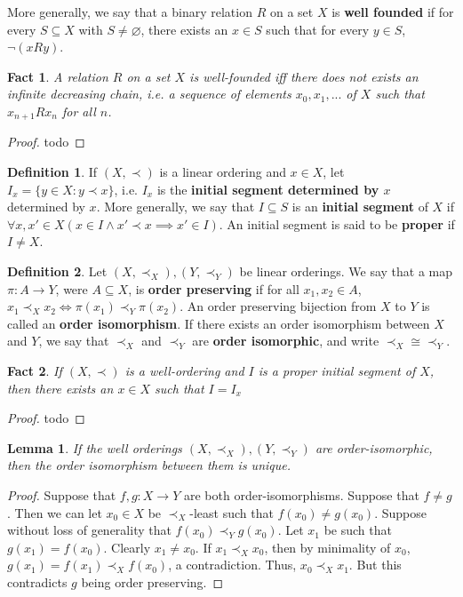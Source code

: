 \documentclass{article}
\theoremstyle{definition}
\newtheorem{definition}{Definition}[section]
\theoremstyle{plain}
\theoremstyle{theorem}
\newtheorem{fact}{Fact}[section]
\newtheorem{lemma}{Lemma}[section]
\begin{document}
	More generally, we say that a binary relation $R$ on a set $X$ is \textbf{well founded} if for every $S \subseteq X$ with $S \neq \varnothing$, there exists an $x \in S$ such that for every $y \in S$, $\neg(xRy)$. 
	\begin{fact}
		A relation $R$ on a set $X$ is well-founded iff there does not exists an infinite decreasing chain, i.e. a sequence of elements $x_0,x_1,...$ of $X$ such that $x_{n+1}Rx_n$ for all $n$. 
	\end{fact}
	\begin{proof}
		todo
	\end{proof}
\begin{definition}
	If $(X,\prec)$ is a linear ordering and $x \in X$, let $I_x = \{y \in X: y \prec x \}$, i.e. $I_x$ is the \textbf{initial segment determined by $x$} determined by $x$. More generally, we say that $I \subseteq S$ is an \textbf{initial segment} of $X$ if $\forall x,x' \in X(x \in I \wedge x' \prec x \implies x' \in I)$. An initial segment is said to be \textbf{proper} if $I \neq X$. 
\end{definition}
\begin{definition}
	Let $(X,\prec_X),(Y,\prec_Y)$ be linear orderings. We say that a map $\pi:A \to Y$, were $A \subseteq X$, is \textbf{order preserving} if for all $x_1,x_2 \in A$, $x_1 \prec_X x_2 \iff \pi(x_1) \prec_Y \pi(x_2)$. An order preserving bijection from $X$ to $Y$ is called an \textbf{order isomorphism}. If there exists an order isomorphism between $X$ and $Y$, we say that $\prec_X$ and $\prec_Y$ are \textbf{order isomorphic}, and write $\prec_X \cong \prec_Y$. 
\end{definition}
\begin{fact}
	If $(X,\prec)$ is a well-ordering and $I$ is a proper initial segment of $X$, then there exists an $x \in X$ such that $I = I_x$
\end{fact}
\begin{proof}
	todo
\end{proof}
\begin{lemma}
	If the well orderings $(X,\prec_X),(Y,\prec_Y)$ are order-isomorphic, then the order isomorphism between them is unique.
\end{lemma}
\begin{proof}
	Suppose that $f,g:X \to Y$ are both order-isomorphisms. Suppose that $f \neq g$. Then we can let $x_0 \in X$ be $\prec_X$-least such that $f(x_0) \neq g(x_0)$. Suppose without loss of generality that $f(x_0) \prec_Y g(x_0)$. Let $x_1$ be such that $g(x_1) = f(x_0)$. Clearly $x_1 \neq x_0$. If $x_1 \prec_X x_0$, then by minimality of $x_0$, $g(x_1) = f(x_1) \prec_X f(x_0)$, a contradiction. Thus, $x_0 \prec_X x_1$. But this contradicts $g$ being order preserving. 
\end{proof}
\end{document}
